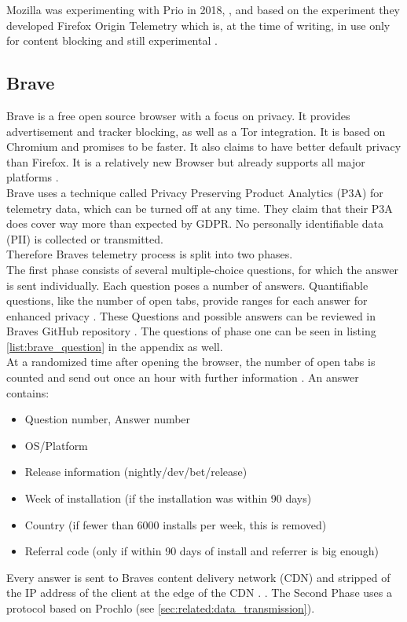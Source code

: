         
        
    
        Mozilla was experimenting with Prio in 2018, \cite{helmer_testing_2018}, and based on the experiment they developed Firefox Origin Telemetry  \cite{englehardt_next_2019} which is, at the time of writing, in use only for content blocking and still experimental \cite{noauthor_origin_nodate}.\\
    
    
    \subsection{Brave}
        Brave is a free open source browser with a focus on privacy. It provides advertisement and tracker blocking, as well as a Tor integration. It is based on Chromium and promises to be faster. It also claims to have better default privacy than Firefox. It is a relatively new Browser but already supports all major platforms \cite{brave_secure_nodate}.\\
        Brave uses a technique called Privacy Preserving Product Analytics (P3A) for telemetry data, which can be turned off at any time.
        They claim that their P3A does cover way more than expected by GDPR. No personally identifiable data (PII) is collected or transmitted.\\
        Therefore Braves telemetry process is split into two phases.\\
        The first phase consists of several multiple-choice questions, for which the answer is sent individually.
        Each question poses a number of answers. Quantifiable questions, like the number of open tabs, provide ranges for each answer for enhanced privacy \cite{brave_privacy-preserving_2019}. These Questions and possible answers can be reviewed in Braves GitHub repository \cite{brave_software_inc_brave-browser_2019}.
        The questions of phase one can be seen in listing \ref{list:brave_question} in the appendix as well.\\
        At a randomized time after opening the browser, the number of open tabs is counted and send out once an hour with further information \cite{brave_privacy-preserving_2019}.
        An answer contains:
        \begin{itemize}
            \item Question number, Answer number
            \item OS/Platform
            \item Release information (nightly/dev/bet/release)
            \item Week of installation (if the installation was within 90 days)
            \item Country (if fewer than 6000 installs per week, this is removed)
            \item Referral code (only if within 90 days of install and referrer is big enough)
        \end{itemize}
        Every answer is sent to Braves content delivery network (CDN) and stripped of the IP address of the client at the edge of the CDN \cite{brave_privacy-preserving_2019}.
        . 
        The Second Phase uses a protocol based on Prochlo (see \ref{sec:related:data_transmission}). 
        
